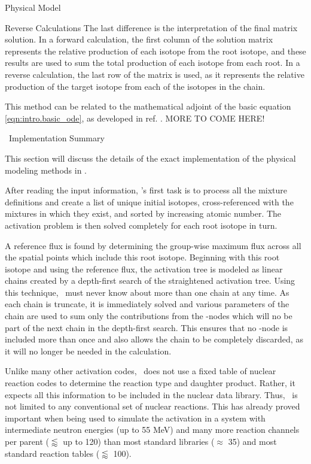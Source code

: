 \begin{chapter}{Physical Model\label{chap:physical}}
\begin{section}{Reverse Calculations}
  The last difference is the interpretation of the final matrix
  solution.  In a forward calculation, the first column of the
  solution matrix represents the relative production of each isotope
  from the root isotope, and these results are used to sum the total
  production of each isotope from each root.  In a reverse
  calculation, the last row of the matrix is used, as it represents
  the relative production of the target isotope from each of the
  isotopes in the chain.

  This method can be related to the mathematical adjoint of the basic
  equation \ref{eqn:intro.basic_ode}, as developed in ref.
  .  MORE TO COME HERE!

\end{section}

\begin{section}{\ALARA\ Implementation Summary}
  
  This section will discuss the details of the exact implementation of
  the physical modeling methods in \ALARA.
  
  After reading the input information, \ALARA's first task is to
  process all the mixture definitions and create a list of unique
  initial isotopes, cross-referenced with the mixtures in which they
  exist, and sorted by increasing atomic number.  The activation
  problem is then solved completely for each root isotope in turn.
  
  A reference flux is found by determining the group-wise maximum flux
  across all the spatial points which include this root isotope.
  Beginning with this root isotope and using the reference flux, the
  activation tree is modeled as linear chains created by a
  depth-first search of the straightened activation tree.  Using this
  technique, \ALARA\ must never know about more than one chain at any
  time.  As each chain is truncate, it is immediately solved and
  various parameters of the chain are used to sum only the
  contributions from the \pc-nodes which will no be part of the next
  chain in the depth-first search.  This ensures that no \pc-node is
  included more than once and also allows the chain to be completely
  discarded, as it will no longer be needed in the calculation.
  
  Unlike many other activation codes, \ALARA\ does not use a fixed
  table of nuclear reaction codes to determine the reaction type and
  daughter product.  Rather, it expects all this information to be
  included in the nuclear data library.  Thus, \ALARA\ is not limited
  to any conventional set of nuclear reactions.  This has already
  proved important when being used to simulate the activation in a
  system with intermediate neutron energies (up to 55
  MeV)\cite{UKA.Thesis} and many more reaction channels per parent
  ($\lessapprox$ up to 120) than most standard libraries ($\approx$
  35) and most standard reaction tables ($\lessapprox$ 100).
  

\end{section}
\end{chapter}
